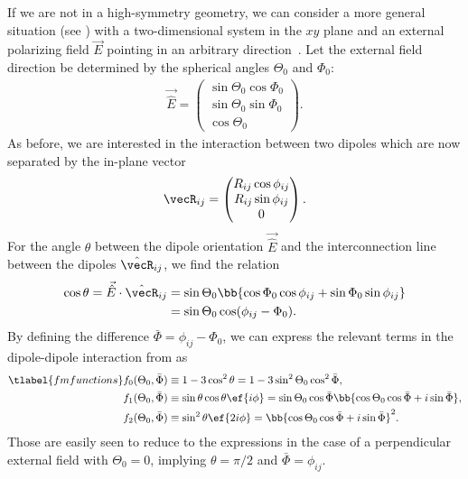 If we are not in a high-symmetry geometry, we can consider a more general situation (see ) with a two-dimensional system in the $xy$ plane and an external polarizing field $\vec{E}$ pointing in an arbitrary direction~\cite{Gorshkov2011c}.
Let the external field direction be determined by the spherical angles $\Theta_0$ and $\Phi_0$:
\begin{align}
    \vec{\hat{E}}=\begin{pmatrix}
        \sin\Theta_0\cos\Phi_0 \\
        \sin\Theta_0\sin\Phi_0 \\
        \cos\Theta_0
    \end{pmatrix}.
\end{align}
As before, we are interested in the interaction between two dipoles which are now separated
by the in-plane vector
\begin{align}
\vecR_{ij} = \begin{pmatrix}R_{ij} \cos\phi_{ij} \\ R_{ij} \sin\phi_{ij} \\ 0\end{pmatrix}.
\end{align}
For the angle $\theta$ between the dipole orientation $\vec{\hat{E}}$ and the interconnection line between the dipoles $\hat{\vecR}_{ij}$, we find the relation
\begin{align}
    \cos\theta = \vec{\hat{E}} \cdot \hat{\vecR}_{ij} &= \sin\Theta_0\bb{\cos\Phi_0\cos\phi_{ij}+\sin\Phi_0\sin\phi_{ij}}\\
                                                      &=\sin\Theta_0\cos(\phi_{ij}-\Phi_0).
\end{align}
By defining the difference $\bar\Phi=\phi_{ij}-\Phi_0$, we can express the relevant terms in the dipole-dipole interaction from  as
\begin{align} \tlabel{fmfunctions}
    f_0(\Theta_0, \bar \Phi)&\equiv 1-3\cos^2\theta = 1-3\sin^2\Theta_0\cos^2\bar\Phi, \vphantom{\bb{\bar \Phi}} \\
    f_1(\Theta_0, \bar \Phi)&\equiv \sin\theta\cos\theta \ef{i\phi} = \sin\Theta_0 \cos\bar\Phi \bb{\cos\Theta_0 \cos\bar\Phi + i \sin \bar\Phi}, \\
    f_2(\Theta_0, \bar \Phi)&\equiv\sin^2\theta \ef{2i\phi} = \bb{\cos\Theta_0 \cos\bar\Phi + i \sin \bar\Phi}^2.
\end{align}
Those are easily seen to reduce to the expressions  in the case of a perpendicular external field with $\Theta_0=0$, implying $\theta=\pi/2$ and $\bar\Phi=\phi_{ij}$.
